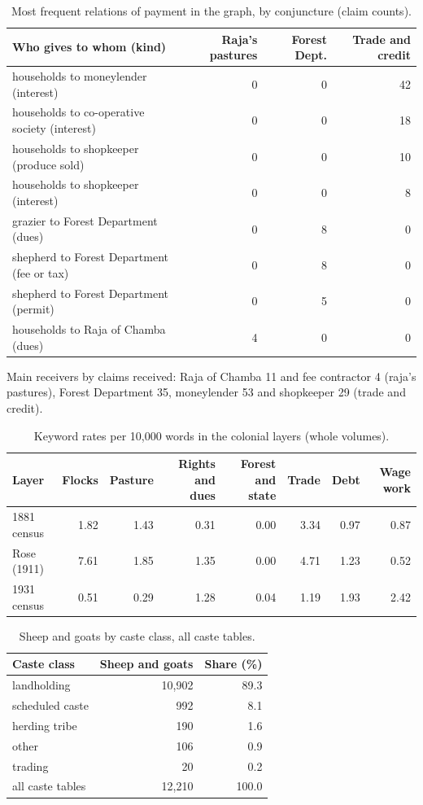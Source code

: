 \documentclass[11pt,a4paper]{article}
\begin{document}
\begin{table}[h]\centering\small
\caption{Most frequent relations of payment in the graph, by conjuncture (claim counts).}\label{tab:flows}
\begin{tabular}{lrrr}\toprule
Who gives to whom (kind) & Raja's pastures & Forest Dept. & Trade and credit\\\midrule
households to moneylender (interest) & 0 & 0 & 42\\
households to co-operative society (interest) & 0 & 0 & 18\\
households to shopkeeper (produce sold) & 0 & 0 & 10\\
households to shopkeeper (interest) & 0 & 0 & 8\\
grazier to Forest Department (dues) & 0 & 8 & 0\\
shepherd to Forest Department (fee or tax) & 0 & 8 & 0\\
shepherd to Forest Department (permit) & 0 & 5 & 0\\
households to Raja of Chamba (dues) & 4 & 0 & 0\\
\bottomrule\end{tabular}

\smallskip
Main receivers by claims received: Raja of Chamba 11 and fee contractor 4
(raja's pastures), Forest Department 35, moneylender 53 and shopkeeper 29
(trade and credit).
\end{table}

\begin{table}[h]\centering\small
\caption{Keyword rates per 10,000 words in the colonial layers (whole volumes).}\label{tab:layers}
\begin{tabular}{lrrrrrrr}\toprule
Layer & Flocks & Pasture & Rights and dues & Forest and state & Trade & Debt & Wage work\\\midrule
1881 census & 1.82 & 1.43 & 0.31 & 0.00 & 3.34 & 0.97 & 0.87\\
Rose (1911) & 7.61 & 1.85 & 1.35 & 0.00 & 4.71 & 1.23 & 0.52\\
1931 census & 0.51 & 0.29 & 1.28 & 0.04 & 1.19 & 1.93 & 2.42\\
\bottomrule\end{tabular}
\end{table}

\begin{table}[h]\centering\small
\caption{Sheep and goats by caste class, all caste tables.}\label{tab:class}
\begin{tabular}{lrr}\toprule
Caste class & Sheep and goats & Share (\%)\\\midrule
landholding & 10,902 & 89.3\\
scheduled caste & 992 & 8.1\\
herding tribe & 190 & 1.6\\
other & 106 & 0.9\\
trading & 20 & 0.2\\
all caste tables & 12,210 & 100.0\\
\bottomrule\end{tabular}
\end{table}
\end{document}
